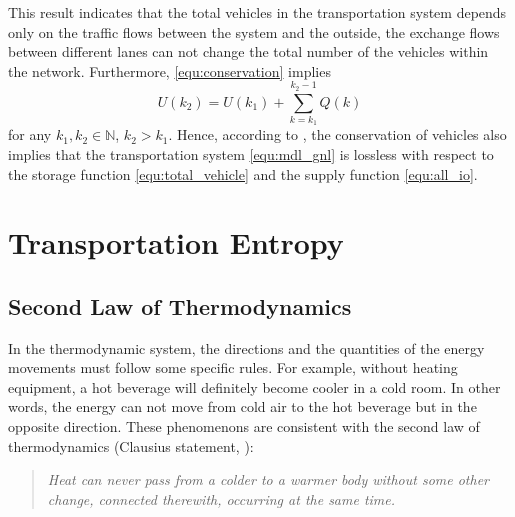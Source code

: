 \documentclass[trsc,nonblindrev]{informs3} %
\begin{document}
This result indicates that the total vehicles in the transportation
system depends only on the traffic flows between the system and the
outside, the exchange flows between different lanes can not change
the total number of the vehicles within the network. Furthermore,
\eqref{equ:conservation} implies
\begin{equation}\label{equ:conservation_ex}
U(k_2) = U(k_1)+\sum_{k=k_1}^{k_2-1}Q(k)
\end{equation}
for any $k_1,k_2\in\mathbb{N}$, $k_2>k_1$. Hence, according to
\citep{willems_dissipative_1972-1}, the conservation of vehicles also
implies that the transportation system \eqref{equ:mdl_gnl} is
lossless with respect to the storage function
\eqref{equ:total_vehicle} and the supply function \eqref{equ:all_io}.

\section{Transportation Entropy}\label{sec:entropy}

\subsection{Second Law of Thermodynamics}

In the thermodynamic system, the directions and the quantities of the
energy movements must follow some specific rules. For example,
without heating equipment, a hot beverage will definitely become
cooler in a cold room. In other words, the energy can not move from
cold air to the hot beverage but in the opposite direction. These
phenomenons are consistent with the second law of thermodynamics
(Clausius statement, \citet{clausius_mechanical_1867}):
\begin{quotation}
\it Heat can never pass from a colder to a warmer body without some
other change, connected therewith, occurring at the same time.
\end{quotation}
\end{document}
